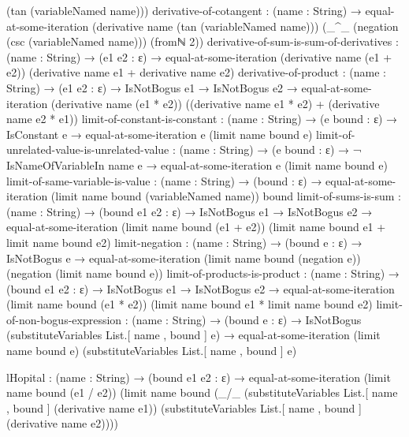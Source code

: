 \documentclass{report}
\begin{document}
\begin{code}
                                   (tan (variableNamed name)))
    derivative-of-cotangent :
      (name : String) →
      equal-at-some-iteration (derivative name (tan (variableNamed name)))
                              (_^_ (negation (csc (variableNamed name)))
                                   (fromℕ 2))
    derivative-of-sum-is-sum-of-derivatives :
      (name : String) →
      (e1 e2 : ε) →
      equal-at-some-iteration (derivative name (e1 + e2))
                              (derivative name e1 + derivative name e2)
    derivative-of-product :
      (name : String) →
      (e1 e2 : ε) →
      IsNotBogus e1 →
      IsNotBogus e2 →
      equal-at-some-iteration (derivative name (e1 * e2))
                              ((derivative name e1 * e2) + (derivative name e2 * e1))
    limit-of-constant-is-constant :
      (name : String) →
      (e bound : ε) →
      IsConstant e →
      equal-at-some-iteration e (limit name bound e)
    limit-of-unrelated-value-is-unrelated-value :
      (name : String) →
      (e bound : ε) →
      ¬ IsNameOfVariableIn name e →
      equal-at-some-iteration e (limit name bound e)
    limit-of-same-variable-is-value :
      (name : String) →
      (bound : ε) →
      equal-at-some-iteration (limit name bound (variableNamed name))
                              bound
    limit-of-sums-is-sum :
      (name : String) →
      (bound e1 e2 : ε) →
      IsNotBogus e1 →
      IsNotBogus e2 →
      equal-at-some-iteration (limit name bound (e1 + e2))
                              (limit name bound e1 + limit name bound e2)
    limit-negation :
      (name : String) →
      (bound e : ε) →
      IsNotBogus e →
      equal-at-some-iteration (limit name bound (negation e))
                              (negation (limit name bound e))
    limit-of-products-is-product :
      (name : String) →
      (bound e1 e2 : ε) →
      IsNotBogus e1 →
      IsNotBogus e2 →
      equal-at-some-iteration (limit name bound (e1 * e2))
                              (limit name bound e1 * limit name bound e2)
    limit-of-non-bogus-expression :
      (name : String) →
      (bound e : ε) →
      IsNotBogus (substituteVariables List.[ name , bound ] e) →
      equal-at-some-iteration (limit name bound e)
                              (substituteVariables List.[ name , bound ] e)

    lHopital :
      (name : String) →
      (bound e1 e2 : ε) →
      equal-at-some-iteration (limit name bound (e1 / e2))
                              (limit name bound (_/_ (substituteVariables List.[ name , bound ]
                                                                          (derivative name e1))
                                                     (substituteVariables List.[ name , bound ]
                                                                          (derivative name e2))))


\end{code}
\end{document}

